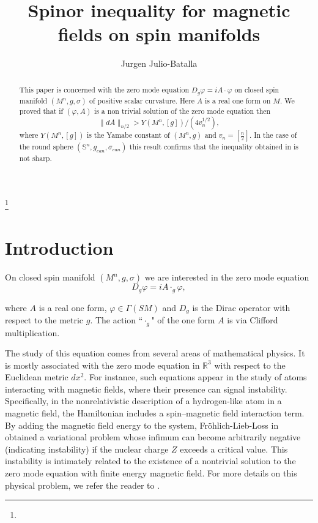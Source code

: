 \documentclass[11pt]{amsart}
\theoremstyle{plain}
\numberwithin{equation}{section}
\theoremstyle{plain}
\begin{document}
\title[]{Spinor inequality for magnetic fields on spin manifolds}

\author{Jurgen Julio-Batalla}
\address{ Universidad Industrial de Santander, Carrera 27 calle 9, 680002, Bucaramanga, Santander, Colombia}
\thanks{ }

\begin{abstract} 
This paper is concerned with the zero mode equation $D_g\varphi=iA\cdot\varphi$ on closed spin manifold $(M^n,g,\sigma)$ of positive scalar curvature. Here $A$ is a real one form on $M$. We proved that if $(\varphi, A)$ is a non trivial solution of the zero mode equation then $$\parallel dA\parallel_{n/2}>Y(M^n,[g])/(4v_n^{1/2}),$$ where $Y(M^n,[g])$ is the Yamabe constant of $(M^n,g)$ and $v_n=\left[\frac{n}{2}\right]$. In the case of the round sphere $(\mathbb{S}^n,g_{can},\sigma_{can})$ this result confirms that the inequality obtained in \cite{Frank} is not sharp.
\end{abstract}

\maketitle


\section{Introduction}
On closed spin manifold $(M^n,g,\sigma)$ we are interested in the zero mode equation
\begin{equation}\label{Zero}
D_g\varphi=iA\cdot_g\varphi,
\end{equation}

where $A$ is a real one form, $\varphi\in \Gamma(SM)$ and $D_g$ is the Dirac operator with respect to the metric $g$. The action ``$\cdot_g$" of the one form $A$ is via Clifford multiplication.

The study of this equation comes from several areas of mathematical physics. It is mostly associated with the zero mode equation in $\mathbb{R}^3$ with respect to the Euclidean metric $dx^2$. For instance, such equations appear in the study of atoms interacting with magnetic fields, where their presence can signal instability. Specifically, in the nonrelativistic description of a hydrogen-like atom in a magnetic field, the Hamiltonian includes a spin–magnetic field interaction term. By adding the magnetic field energy to the system, Fröhlich-Lieb-Loss in \cite{Frohlich} obtained a variational problem whose infimum can become arbitrarily negative (indicating instability) if the nuclear charge $Z$ exceeds a critical value. This instability is intimately related to the existence of a nontrivial solution to the zero mode equation with finite energy magnetic field. For more details on this physical problem, we refer the reader to \cite{Frohlich}.
\end{document}
